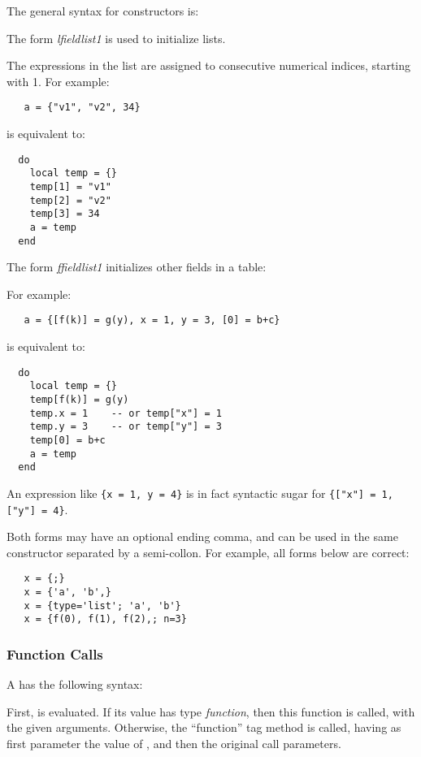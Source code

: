 The general syntax for constructors is:
\begin{Produc}
\end{Produc}

The form \emph{lfieldlist1} is used to initialize lists.
\begin{Produc}
\end{Produc}%
The expressions in the list are assigned to consecutive numerical indices,
starting with 1.
For example:
\begin{verbatim}
   a = {"v1", "v2", 34}
\end{verbatim}
is equivalent to:
\begin{verbatim}
  do
    local temp = {}
    temp[1] = "v1"
    temp[2] = "v2"
    temp[3] = 34
    a = temp
  end
\end{verbatim}

The form \emph{ffieldlist1} initializes other fields in a table:
\begin{Produc}
\end{Produc}%
For example:
\begin{verbatim}
   a = {[f(k)] = g(y), x = 1, y = 3, [0] = b+c}
\end{verbatim}
is equivalent to:
\begin{verbatim}
  do
    local temp = {}
    temp[f(k)] = g(y)
    temp.x = 1    -- or temp["x"] = 1
    temp.y = 3    -- or temp["y"] = 3
    temp[0] = b+c
    a = temp
  end
\end{verbatim}
An expression like \verb|{x = 1, y = 4}| is
in fact syntactic sugar for \verb|{["x"] = 1, ["y"] = 4}|.

Both forms may have an optional ending comma,
and can be used in the same constructor separated by
a semi-collon.
For example, all forms below are correct:
\begin{verbatim}
   x = {;}
   x = {'a', 'b',}
   x = {type='list'; 'a', 'b'}
   x = {f(0), f(1), f(2),; n=3}
\end{verbatim}

\subsubsection{Function Calls}  \label{functioncall}
A  has the following syntax:
\begin{Produc}
\end{Produc}%
First,  is evaluated.
If its value has type \emph{function},
then this function is called,
with the given arguments.
Otherwise, the ``function'' tag method is called,
having as first parameter the value of ,
and then the original call parameters.

